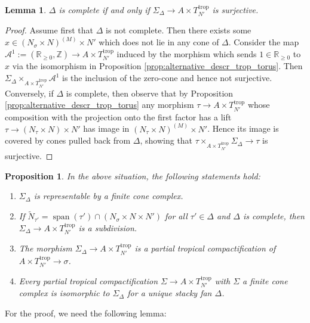 \documentclass[11pt]{amsart}
\newtheorem{proposition}[theorem]{Proposition}
\newtheorem{lemma}[theorem]{Lemma}
\theoremstyle{definition}
\theoremstyle{remark}
\DeclareMathOperator{\Span}{span}
\def\trop{\mathrm{trop}}
\begin{document}
\begin{lemma}
	\label{lem:complete_iff_cpt}
	$\Delta$ is complete if and only if $\Sigma_{\Delta}\to A\times T_{N'}^{\trop}$ is surjective.
\end{lemma}

\begin{proof}
	Assume first that $\Delta$ is not complete. Then there exists some $x\in (N_{\sigma}\times N)^{(M)}\times N'$
	which does not lie in any cone of $\Delta$. Consider the map $\mathcal{A}^{1}:=(\mathbb{R}_{\ge 0},\mathbb{Z})\to A\times T_{N'}^{\trop}$
	induced by the morphism which sends $1\in \mathbb{R}_{\ge 0}$ to $x$ via the isomorphism in Proposition \ref{prop:alternative_descr_trop_torus}.
	Then $\Sigma_{\Delta}\times_{A\times T_{N'}^{\trop}}\mathcal{A}^{1}$ is the inclusion of the zero-cone and hence not surjective.
	Conversely, if $\Delta$ is complete, then observe that by
	Proposition \ref{prop:alternative_descr_trop_torus} any morphism $\tau\to A\times T_{N'}^{\trop}$ whose composition with the projection onto the first factor has a lift
	$\tau\to (N_{\tau}\times N)\times N'$ has image in $(N_{\tau}\times N)^{(M)}\times N'$. Hence its image is covered by
	cones pulled back from $\Delta$, showing that $\tau\times_{A\times T_{N'}^{\trop}}\Sigma_{\Delta}\to \tau$ is surjective.
\end{proof}

\begin{proposition}
	\label{prop:cone_cx_iff_fan}
	In the above situation, the following statements hold:
\begin{enumerate}
	\item $\Sigma_{\Delta}$ is representable by a finite cone complex.
	\item If $\tilde{N}_{\tau'}=\Span(\tau')\cap (N_{\sigma}\times N \times N')$ for all $\tau'\in \Delta$ and $\Delta$ is complete, then $\Sigma_{\Delta}\to A\times T_{N'}^{\trop}$ is a subdivision.
	\item The morphism $\Sigma_{\Delta}\to A\times T_{N'}^{\trop}$ is a partial tropical compactification of $A\times T_{N'}^{\trop}\to \sigma$.
	\item Every partial tropical compactification $\Sigma\to A\times T_{N'}^{\trop}$ with $\Sigma$ a finite cone complex is isomorphic to $\Sigma_{\Delta}$ for a unique stacky fan $\Delta$.
\end{enumerate}
\end{proposition}

For the proof, we need the following lemma:
\end{document}
